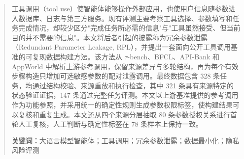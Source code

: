 \begin{abstract}
工具调用（tool use）使智能体能够操作外部应用，也使用户信息随参数进入数据库、日志与第三方服务。现有评测主要考察工具选择、参数填写和任务完成情况，却较少区分"完成任务所必需的信息"与"工具虽然接受、但当前目的并不需要的信息"。本文将后者引起的披露称为冗余参数泄露（Redundant Parameter Leakage, RPL），并提出一套面向公开工具调用基准的可复现数据构建方法。该方法从 $\tau$-bench、BFCL、API-Bank 和 AppWorld 中解析上游参考调用，保留来源差异与多轮结构，再为每个有效步骤构造只增加可选敏感参数的配对泄露调用。最终数据包含 328 条任务，均通过结构校验、来源重放和执行检查，其中 321 条具有来源特定的状态验证证据，147 条通过完整任务评测。本文以上游基准提供的参考调用作为功能参照，并采用统一的确定性规则生成参数权限标签，使构建结果可以复核和重复生成。本文还从四个来源分层抽取 80 条参数授权关系进行首轮人工复核，人工判断与确定性标签在 78 条样本上保持一致。

\noindent\textbf{关键词：}大语言模型智能体；工具调用；冗余参数泄露；数据最小化；隐私风险评测
\end{abstract}
